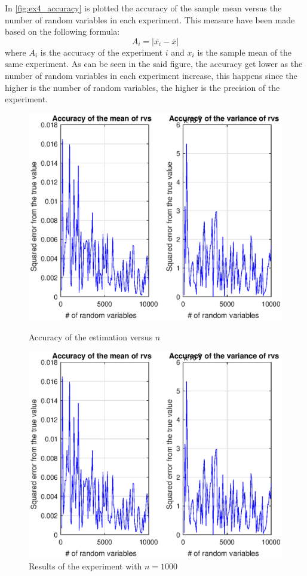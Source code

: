 \documentclass[11pt,a4paper]{article}
\begin{document}
In \autoref{fig:ex4_accuracy} is plotted the accuracy of the sample mean versus the number of random variables in each experiment. This measure have been made based on the following formula:
\begin{equation}
  A_i = |\overline{x_i} - \overline{x}|
\end{equation}
where $A_i$ is the accuracy of the experiment $i$ and $x_i$ is the sample mean of the same experiment. As can be seen in the said figure, the accuracy get lower as the number of random variables in each experiment increase, this happens since the higher is the number of random variables, the higher is the precision of the experiment.
\begin{figure}[ht]
	\centering
	\begin{minipage}{0.45\textwidth}
		\centering
		\includegraphics[width=\textwidth]{ex4_accuracy}
		\caption{Accuracy of the estimation versus $n$}
		\label{fig:ex4_accuracy}
	\end{minipage}
	\begin{minipage}{0.45\textwidth}
		\centering
		\includegraphics[width=\textwidth]{ex4_accuracy}
		\caption{Results of the experiment with $n=1000$}
		\label{fig:ex4_CI}
	\end{minipage}
\end{figure}
\end{document}

